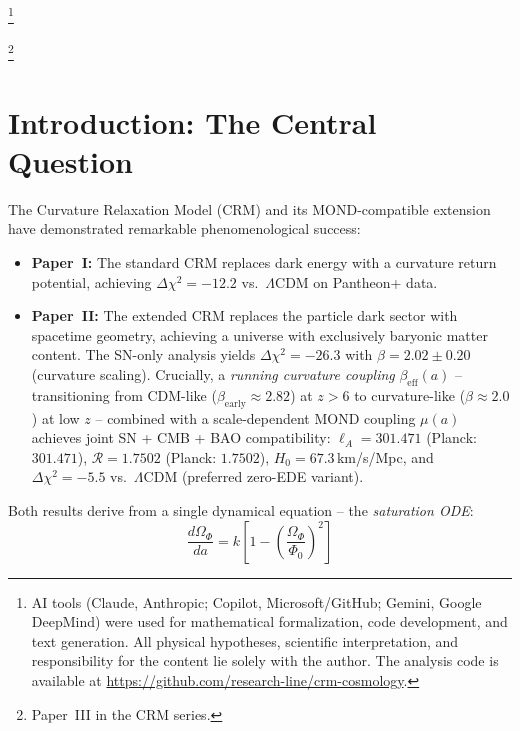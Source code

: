 \documentclass[aps,prd,twocolumn,superscriptaddress,nofootinbib]{revtex4-2}
\begin{document}
\thanks{AI tools (Claude, Anthropic; Copilot, Microsoft/GitHub; Gemini, Google DeepMind) were used for mathematical formalization, code development, and text generation. All physical hypotheses, scientific interpretation, and responsibility for the content lie solely with the author. The analysis code is available at \url{https://github.com/research-line/crm-cosmology}.}

\thanks{Paper~III in the CRM series.}

\maketitle


\section{Introduction: The Central Question}
\label{sec:intro}

The Curvature Relaxation Model (CRM) \cite{Geiger2026} and its MOND-compatible extension \cite{Geiger2026b} have demonstrated remarkable phenomenological success:

\begin{itemize}
\item \textbf{Paper~I:} The standard CRM replaces dark energy with a curvature return potential, achieving $\Delta\chi^2 = -12.2$ vs.\ $\Lambda$CDM on Pantheon+ data.
\item \textbf{Paper~II:} The extended CRM replaces the particle dark sector with spacetime geometry, achieving a universe with exclusively baryonic matter content. The SN-only analysis yields $\Delta\chi^2 = -26.3$ with $\beta = 2.02 \pm 0.20$ (curvature scaling). Crucially, a \textit{running curvature coupling} $\beta_{\mathrm{eff}}(a)$ -- transitioning from CDM-like ($\beta_{\mathrm{early}} \approx 2.82$) at $z > 6$ to curvature-like ($\beta \approx 2.0$) at low $z$ -- combined with a scale-dependent MOND coupling $\mu(a)$ achieves joint SN + CMB + BAO compatibility: $\ell_A = 301.471$ (Planck: $301.471$), $\mathcal{R} = 1.7502$ (Planck: $1.7502$), $H_0 = 67.3$\,km/s/Mpc, and $\Delta\chi^2 = -5.5$ vs.\ $\Lambda$CDM (preferred zero-EDE variant).
\end{itemize}

Both results derive from a single dynamical equation -- the \textit{saturation ODE}:
\begin{equation}
\frac{d\Omega_\Phi}{da} = k \left[1 - \left(\frac{\Omega_\Phi}{\Phi_0}\right)^2\right]
\label{eq:saturation_ode}
\end{equation}
\end{document}

